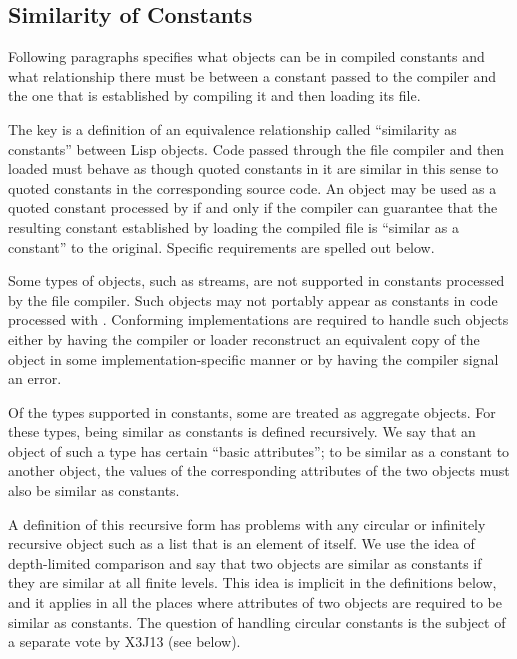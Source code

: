 \subsection{Similarity of Constants}
\label{SIMILAR-AS-A-CONSTANT-SECTION}

Following paragraphs specifies what objects can be in compiled constants and
what relationship there must be between a constant
passed to the compiler and the one that is established by compiling it
and then loading its file.

The key is a definition of an equivalence relationship called
``similarity as constants''
between Lisp
objects.  Code passed through the file
compiler and then loaded must behave as though quoted constants in it
are similar in this sense to quoted constants in the corresponding source code.
An object may be used as a quoted constant processed by 
if and only if the compiler can guarantee that the resulting constant established
by loading the compiled file is ``similar as a constant'' to the
original.  Specific requirements are spelled out below.

Some types of objects, such as streams, are not supported in constants
processed by the file compiler.  Such objects may not portably appear
as constants in code processed with .  Conforming
implementations are required to handle such objects either by having
the compiler or loader reconstruct an equivalent copy of the
object in some implementation-specific manner or by having the
compiler signal an error.

Of the types supported in constants, some are treated as aggregate
objects.  For these types, being similar as constants is defined
recursively.  We say that an object of such a type has certain ``basic
attributes''; to be similar as a constant to another object, the
values of the corresponding attributes of the two objects must also be
similar as constants.

A definition of this recursive form has problems with any circular or infinitely
recursive object such as a list that is an element of itself.  We use
the idea of depth-limited comparison and say that two objects are
similar as constants if they are similar at all finite levels.  This
idea is implicit in the definitions below, and it applies in all the
places where attributes of two objects are required to be similar as
constants.  The question of handling circular constants is the subject
of a separate vote by X3J13 (see below).


